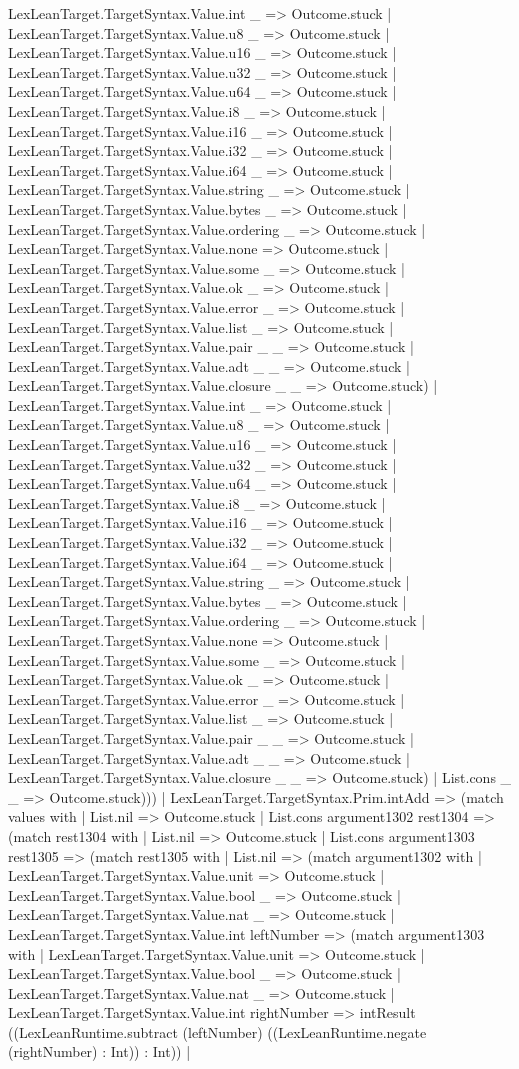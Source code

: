 \documentclass[11pt]{article}
\begin{document}
LexLeanTarget.TargetSyntax.Value.int \_ => Outcome.stuck | LexLeanTarget.TargetSyntax.Value.u8 \_ => Outcome.stuck | LexLeanTarget.TargetSyntax.Value.u16 \_ => Outcome.stuck | LexLeanTarget.TargetSyntax.Value.u32 \_ => Outcome.stuck | LexLeanTarget.TargetSyntax.Value.u64 \_ => Outcome.stuck | LexLeanTarget.TargetSyntax.Value.i8 \_ => Outcome.stuck | LexLeanTarget.TargetSyntax.Value.i16 \_ => Outcome.stuck | LexLeanTarget.TargetSyntax.Value.i32 \_ => Outcome.stuck | LexLeanTarget.TargetSyntax.Value.i64 \_ => Outcome.stuck | LexLeanTarget.TargetSyntax.Value.string \_ => Outcome.stuck | LexLeanTarget.TargetSyntax.Value.bytes \_ => Outcome.stuck | LexLeanTarget.TargetSyntax.Value.ordering \_ => Outcome.stuck | LexLeanTarget.TargetSyntax.Value.none => Outcome.stuck | LexLeanTarget.TargetSyntax.Value.some \_ => Outcome.stuck | LexLeanTarget.TargetSyntax.Value.ok \_ => Outcome.stuck | LexLeanTarget.TargetSyntax.Value.error \_ => Outcome.stuck | LexLeanTarget.TargetSyntax.Value.list \_ => Outcome.stuck | LexLeanTarget.TargetSyntax.Value.pair \_ \_ => Outcome.stuck | LexLeanTarget.TargetSyntax.Value.adt \_ \_ => Outcome.stuck | LexLeanTarget.TargetSyntax.Value.closure \_ \_ => Outcome.stuck) | LexLeanTarget.TargetSyntax.Value.int \_ => Outcome.stuck | LexLeanTarget.TargetSyntax.Value.u8 \_ => Outcome.stuck | LexLeanTarget.TargetSyntax.Value.u16 \_ => Outcome.stuck | LexLeanTarget.TargetSyntax.Value.u32 \_ => Outcome.stuck | LexLeanTarget.TargetSyntax.Value.u64 \_ => Outcome.stuck | LexLeanTarget.TargetSyntax.Value.i8 \_ => Outcome.stuck | LexLeanTarget.TargetSyntax.Value.i16 \_ => Outcome.stuck | LexLeanTarget.TargetSyntax.Value.i32 \_ => Outcome.stuck | LexLeanTarget.TargetSyntax.Value.i64 \_ => Outcome.stuck | LexLeanTarget.TargetSyntax.Value.string \_ => Outcome.stuck | LexLeanTarget.TargetSyntax.Value.bytes \_ => Outcome.stuck | LexLeanTarget.TargetSyntax.Value.ordering \_ => Outcome.stuck | LexLeanTarget.TargetSyntax.Value.none => Outcome.stuck | LexLeanTarget.TargetSyntax.Value.some \_ => Outcome.stuck | LexLeanTarget.TargetSyntax.Value.ok \_ => Outcome.stuck | LexLeanTarget.TargetSyntax.Value.error \_ => Outcome.stuck | LexLeanTarget.TargetSyntax.Value.list \_ => Outcome.stuck | LexLeanTarget.TargetSyntax.Value.pair \_ \_ => Outcome.stuck | LexLeanTarget.TargetSyntax.Value.adt \_ \_ => Outcome.stuck | LexLeanTarget.TargetSyntax.Value.closure \_ \_ => Outcome.stuck) | List.cons \_ \_ => Outcome.stuck))) | LexLeanTarget.TargetSyntax.Prim.intAdd => (match values with | List.nil => Outcome.stuck | List.cons argument1302 rest1304 => (match rest1304 with | List.nil => Outcome.stuck | List.cons argument1303 rest1305 => (match rest1305 with | List.nil => (match argument1302 with | LexLeanTarget.TargetSyntax.Value.unit => Outcome.stuck | LexLeanTarget.TargetSyntax.Value.bool \_ => Outcome.stuck | LexLeanTarget.TargetSyntax.Value.nat \_ => Outcome.stuck | LexLeanTarget.TargetSyntax.Value.int leftNumber => (match argument1303 with | LexLeanTarget.TargetSyntax.Value.unit => Outcome.stuck | LexLeanTarget.TargetSyntax.Value.bool \_ => Outcome.stuck | LexLeanTarget.TargetSyntax.Value.nat \_ => Outcome.stuck | LexLeanTarget.TargetSyntax.Value.int rightNumber => intResult ((LexLeanRuntime.subtract (leftNumber) ((LexLeanRuntime.negate (rightNumber) : Int)) : Int)) | 
\end{document}

